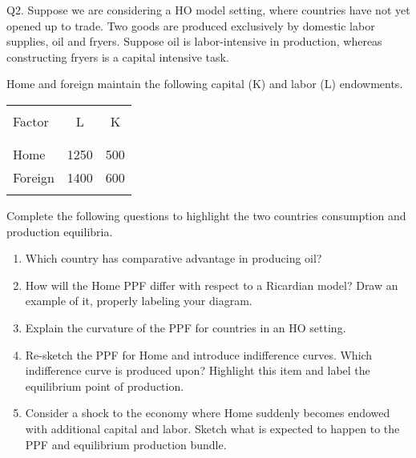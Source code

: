 \documentclass[12pt]{article}
\begin{document}
\newpage

\noindent Q2. Suppose we are considering a HO model setting, where countries have not yet opened up to trade.
Two goods are produced exclusively by domestic labor supplies, oil and fryers.
Suppose oil is labor-intensive in production, whereas constructing fryers is a capital intensive task.

\noindent Home and foreign maintain the following capital (K) and labor (L) endowments. 

\begin{table}[!h]
	\centering
	\begin{tabular}[t]{l c c }
		\hline
		&&\\
		Factor & L & K  \\
		&&\\
		\hline
		&&\\
		Home & 1250 & 500  \\
		Foreign & 1400 & 600 \\
		&&\\
		\hline
	\end{tabular}
\end{table}



\noindent Complete the following questions to highlight the two countries consumption and production equilibria. 

\begin{enumerate}[1)]

\item Which country has comparative advantage in producing oil?

\newpage

\item How will the Home PPF differ with respect to a Ricardian model? Draw an example of it, properly labeling your diagram.

\vspace{3.4in}

\item Explain the curvature of the PPF for countries in an HO setting. 

\bigskip

\bigskip

\bigskip

\bigskip

\newpage

\item Re-sketch the PPF for Home and introduce indifference curves. Which indifference curve is produced upon? Highlight this item and label the equilibrium point of production.


\vspace{4.0in}


\item Consider a shock to the economy where Home suddenly becomes endowed with additional capital and labor. Sketch what is expected to happen to the PPF and equilibrium production bundle.

\vspace{4in}

\end{enumerate}
\end{document}
